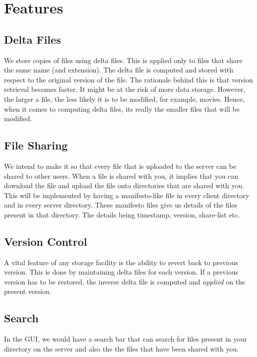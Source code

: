 \documentclass[]{article}
\begin{document}
\section{\LARGE Features}
\subsection{Delta Files}
We store copies of files using delta files. This is applied only to files that share the same name (and extension). The delta file is computed and stored with respect to the original version of the file. The rationale behind this is that version retrieval becomes faster. It might be at the risk of more data storage. However, the larger a file, the less likely it is to be modified, for example, movies. Hence, when it comes to computing delta files, its really the smaller files that will be modified.
\subsection{File Sharing}
We intend to make it so that every file that is uploaded to the server can be shared to other users. When a file is shared with you, it implies that you can download the file and upload the file onto directories that are shared with you. This will be implemented by having a manifesto-like file in every client directory and in every server directory.
These manifesto files give us details of the files present in that directory. The details being timestamp, version, share-list etc.

\subsection{Version Control}
A vital feature of any storage facility is the ability to revert back to previous version. This is done by maintaining delta files for each version. If a previous version has to be restored, the inverse delta file is computed and \textit{applied} on the present version. 

\subsection{Search}
In the GUI, we would have a search bar that can search for files present in your directory on the server and also the the files that have been shared with you.
\end{document}
